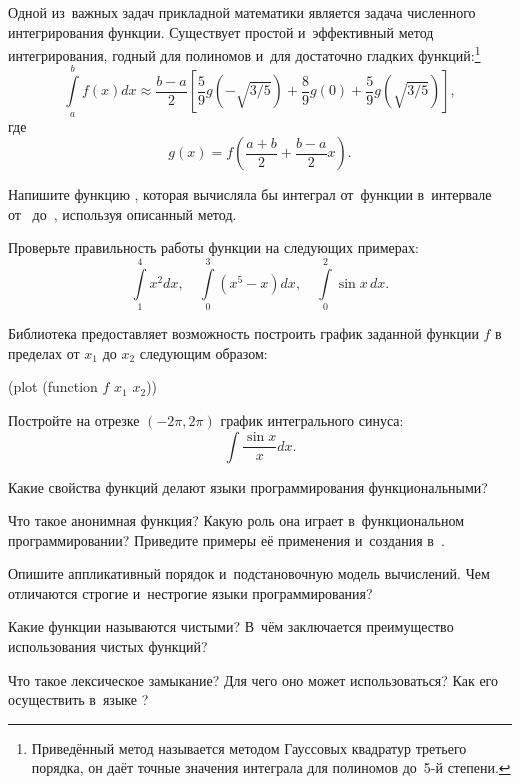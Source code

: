\begin{Assignment}

Одной из~важных задач прикладной математики является задача численного интегрирования функции. Существует простой и~эффективный метод интегрирования, годный для полиномов и~для достаточно гладких функций:\footnote{Приведённый метод называется методом Гауссовых квадратур третьего порядка, он даёт точные значения интеграла для полиномов до~5-й степени.}
$$\int\limits_a^b f(x) dx \approx \frac{b-a}2\left[ \frac59 g\left(-\sqrt{3/5}\right)+\frac89g(0)+\frac59g\left(\sqrt{3/5}\right)\right],$$ где $$g(x)=f\left(\frac{a+b}2+\frac{b-a}2x\right).$$

Напишите функцию , которая вычисляла бы интеграл от~функции  в~интервале от~ до~, используя описанный метод.

Проверьте правильность работы функции на следующих примерах:
$$\int\limits_1^4 x^2 dx,\quad \int\limits_0^3 (x^5-x) dx,\quad \int\limits_0^2 \sin x\,dx.$$

Библиотека  предоставляет возможность построить график заданной функции $f$ в пределах от $x_1$ до $x_2$ следующим образом:
\begin{SchemeCode}
  (plot (function $f$ $x_1$ $x_2$))
\end{SchemeCode}
Постройте на отрезке $(-2\pi, 2\pi)$ график интегрального синуса: $$\int\frac{\sin x}{x} dx.$$ 

\end{Assignment}

\begin{Queeze}
  \item Какие свойства функций делают языки программирования функциональными?
  \item Что такое анонимная функция? Какую роль она играет в~функциональном программировании? Приведите примеры её применения и~создания в~\Scheme.
  \item Опишите аппликативный порядок и~подстановочную модель вычислений. Чем отличаются строгие и~нестрогие языки программирования?
  \item Какие функции называются чистыми? В~чём заключается преимущество использования чистых функций?
  \item Что такое лексическое замыкание? Для чего оно может использоваться? Как его осуществить в~языке \Scheme?
\end{Queeze}


